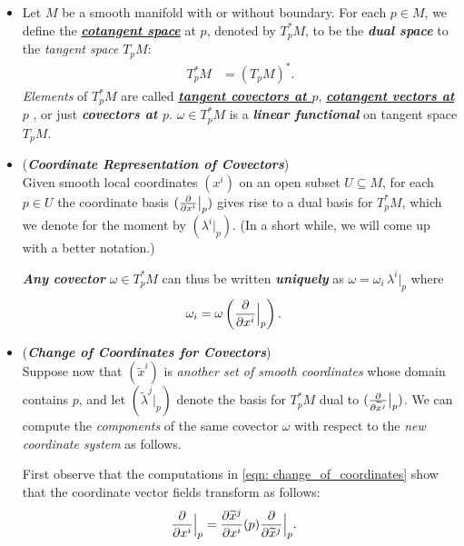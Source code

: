 \documentclass[11pt]{article}
\begin{document}
\begin{itemize}
\item 
\begin{definition}
Let $M$ be a smooth manifold with or without boundary. For each $p \in M$, we define the \underline{\emph{\textbf{cotangent space}}} at $p$, denoted by $T_{p}^{*}M$, to be the \emph{\textbf{dual space}} to the \emph{tangent space} $T_{p}M$:
\begin{align*}
T_{p}^{*}M  &= (T_{p}M)^{*}.
\end{align*} \emph{Elements} of $T_{p}^{*}M$ are called \underline{\emph{\textbf{tangent covectors at $p$}}}, \underline{\emph{\textbf{cotangent vectors at $p$}}} , or just \emph{\textbf{covectors at $p$}}. $\omega \in T_{p}^{*}M$ is a \emph{\textbf{linear functional}} on tangent space $T_pM$. 
\end{definition}


\item 
\begin{remark} (\emph{\textbf{Coordinate Representation of Covectors}}) \citep{lee2003introduction}\\
Given smooth local coordinates $(x^i)$ on an open subset $U \subseteq M$, for each $p \in U$ the coordinate basis $(\frac{\partial }{ \partial x^{i}}\big|_{p})$ gives rise to a dual basis for $T_{p}^{*}M$, which we denote for the moment by $(\lambda^i\big|_{p})$. (In a short while, we will come up with a better notation.) 

\emph{\textbf{Any covector}} $\omega \in T_{p}^{*}M$ can thus be written \emph{\textbf{uniquely}} as $\omega = \omega_{i}\,\lambda^i\big|_{p}$ where
\begin{align}
\omega_{i} &= \omega\left(\frac{\partial }{ \partial x^{i}}\Bigr|_{p}\right). \label{eqn: covectors_components}
\end{align}
\end{remark}

\item \begin{remark} (\emph{\textbf{Change of Coordinates for Covectors}}) \citep{lee2003introduction}\\
Suppose now that  $(\widetilde{x}^i)$ is \emph{another set of smooth coordinates} whose domain contains $p$, and let $(\widetilde{\lambda}^{j}\big|_{p})$ denote the basis for $T_{p}^{*}M$ dual to $(\frac{\partial }{ \partial \widetilde{x}^{j}}\big|_{p})$. We can compute the \emph{components} of the same covector $\omega$ with respect to the \emph{new coordinate system} as follows. 

First observe that the computations in \eqref{eqn: change_of_coordinates} show that the coordinate vector fields transform as follows:
\begin{align*}
\frac{\partial }{ \partial x^{i}}\Bigr|_{p} &= \frac{\partial \widetilde{x}^{j}}{ \partial x^{i}}(p)\frac{\partial }{ \partial \widetilde{x}^{j}}\Bigr|_{p}.
\end{align*}


\end{remark}
\end{itemize}
\end{document}
